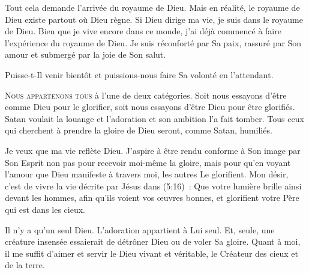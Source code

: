 Tout cela demande l'arrivée du royaume de Dieu.
 Mais en réalité, le royaume de Dieu existe partout où Dieu règne.
 Si Dieu dirige ma vie, je suis dans le royaume de Dieu.
 Bien que je vive encore dans ce monde, j'ai déjà commencé à faire
 l'expérience du royaume de Dieu. Je suis réconforté par Sa paix,
 rassuré par Son amour et submergé par la joie de Son salut. 

Puisse-t-Il venir bientôt
 \ocadr et puissions-nous faire Sa volonté en l'attendant. 

\dvrule






\lettrine{N}{ous appartenons tous} à l'une de deux catégories.
 Soit nous essayons d'être comme Dieu pour le glorifier,
 soit nous essayons d'être Dieu pour être glorifiés.
 Satan voulait la louange et l'adoration
 \ocadr et son ambition l'a fait tomber.
 Tous ceux qui cherchent à prendre la gloire de Dieu seront,
 comme Satan, humiliés. 


Je veux que ma vie reflète Dieu. J'aspire à être rendu conforme
 à Son image par Son Esprit \ocadr non pas pour recevoir moi-même la gloire,
 mais pour qu'en voyant l'amour que Dieu manifeste à travers moi,
 les autres Le glorifient.
 Mon désir, c'est de vivre la vie décrite par Jésus
 dans (5:16)~:
 \og Que votre lumière brille ainsi devant les hommes,
 afin qu'ils voient vos œuvres bonnes,
 et glorifient votre Père qui est dans les cieux. \fg{}

Il n'y a qu'un seul Dieu. L'adoration appartient à Lui seul.
 Et, seule, 
 une créature insensée essaierait de détrôner Dieu ou de voler Sa gloire.
 Quant à moi, il me suffit d'aimer et servir le Dieu vivant et véritable,
 le Créateur des cieux et de la terre. 

